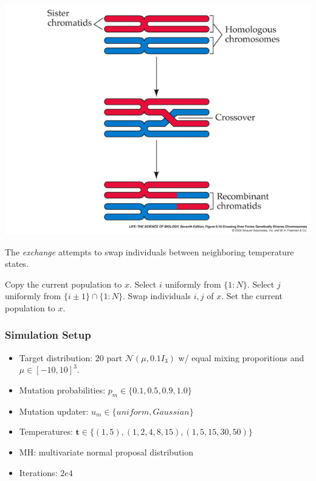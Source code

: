 \documentclass{beamer}\usepackage[]{graphicx}\usepackage[]{color}
\newcommand{\bt}{\mathbf t}
\begin{document}
 \begin{frame}
   \includegraphics[height=\textheight]{figure/xover}
 \end{frame}
 

\begin{frame}
\begin{algorithm}[H]
\caption{The {\it exchange} attempts to swap individuals between neighboring temperature states.}
  \label{alg:exchange}
  \footnotesize
  \begin{algorithmic}
    \State Copy the current population to $x$.
    \State Select $i$ uniformly from $\{1\colon N\}$. 
    \State Select $j$ uniformly from $\{i\pm 1\}\cap\{1\colon N\}$.
    \State Swap individuals $i,j$ of $x$.
    \State Set the current population to $x$.
    \EndWp
    \EndProcedure
  \end{algorithmic}
\end{algorithm}
\end{frame}

\begin{frame}
  \frametitle{Simulation Setup}
  \begin{itemize}
  \item Target distribution: 20 part $\mathcal{N}(\mu, 0.1I_3)$ w/ equal mixing proporitions and $\mu \in [-10, 10]^3$.
  \item Mutation probabilities: $p_m \in \{0.1, 0.5, 0.9, 1.0\}$
  \item Mutation updater: $u_m \in \{uniform, Gaussian\}$
  \item Temperatures: $ \bt \in \{ (1,5), (1, 2, 4, 8, 15), (1,5,15,30,50) \}$
  \item MH: multivariate normal proposal distribution
  \item Iterations: $2e4$
  \end{itemize}
\end{frame}
\end{document}
